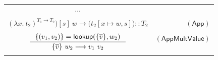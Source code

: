 \documentclass[preprint,authoryear,sort&compress,9pt,nocopyrightspace]{article}
\newcommand\rulename[1]{\mathsf{(#1)}}
\newcommand{\tto}{\longrightarrow}
\newcommand{\conf}[2][s]{(#2)[#1]}
\newcommand{\confxW}[1]{#1 [\SubxDW]}
\newcommand{\confyW}[1]{#1 [\SubyDW]}
\newcommand{\confext}[1]{#1 [x \mapsto v \oplus s]}
\newcommand{\confextW}[1]{#1 [x \mapsto w \oplus s]}
\newcommand{\SubxDW}{x \mapsto w,s}
\newcommand{\SubyDW}{y \mapsto w,s}
\newcommand{\ascrip}[1]{#1::T}
\newcommand{\oletP}[3]{\mathsf{mlet} \ x = #2 \ \mathsf{in}  \ #3}
\newcommand{\appD}{t_1 \ t_2}
\newcommand{\negacion}[1]{\mathsf{not} \ #1}
\newcommand{\suma}[1]{\mathsf{add1} \ #1}
\newcommand{\absDT}{(\lambda x. \ t_2) ^{T_1 \to T_2}}
\newcommand{\intt}{\mathsf{Int}}
\newcommand{\filtrar}{\mathsf{filter}}
\newcommand{\buscar}{\mathsf{lookup}}
\begin{document}
\begin{figure}
\begin{small}
\begin{center}
\begin{tabular}{|c r|}
\hline
$\cdots$&\\
${\absDT)[s]\ w \tto (t_2 [x \mapsto w, s]}) :: T_2 $&$\rulename{App}$\\
&\\
$\inference{\{(v_1, v_2)\} = \buscar(\{\overline{v}\}, w_2)}{\{\overline{v}\} \ w_2 \tto v_1 \ v_2}$&$\rulename{AppMultValue}$\\
&\\

\end{tabular}
\end{center}
\end{small}
\end{figure}
\end{document}
